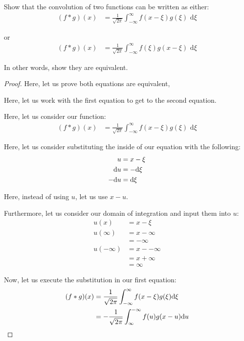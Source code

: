\item Show that the convolution of two functions can be written as either:
%
\begin{align*}
  (f * g) (x) & = \frac{1}{\sqrt{2 \pi}} \int^\infty_{-\infty} f(x - \xi) g(\xi) \text{ d}\xi
\end{align*}

or
%
\begin{align*}
  (f * g) (x) & = \frac{1}{\sqrt{2 \pi}} \int^\infty_{-\infty} f(\xi) g(x - \xi) \text{ d}\xi
\end{align*}

In other words, show they are equivalent.


\begin{proof}
  Here, let us prove both equations are equivalent,

Here, let us work with the first equation to get to the second equation.

Here, let us consider our function:
%
\begin{align}
  (f * g)(x) & = \frac{1}{\sqrt{2 \pi}} \int^\infty_{-\infty} f(x - \xi) g(\xi) \text{ d}\xi
\end{align}

Here, let us consider substituting the inside of our equation with the following:
%
\begin{align}
  u & = x - \xi\\
  \text du & = - \text d\xi\\
  - \text du & = \text d\xi
\end{align}

Here, instead of using $u$, let us use $x - u$.

Furthermore, let us consider our domain of integration and input them into $u$:
%
\begin{align}
  u(x) & = x - \xi\\
  u(\infty) & = x - \infty\\
  & = -\infty\\
  u(-\infty) & = x - - \infty\\
  & = x + \infty\\
  & = \infty
\end{align}

Now, let us execute the substitution in our first equation:
%
\begin{align}
  (f * g)(x)
  & =
  \frac{1}{\sqrt{2 \pi}}
  \int^\infty_{-\infty}
  f(x - \xi) g(\xi) \text d \xi\\
  & =
  -\frac{1}{\sqrt{2 \pi}}
  \int^{-\infty}_\infty
  f(u) g(x - u) \text du
\end{align}


\end{proof}
